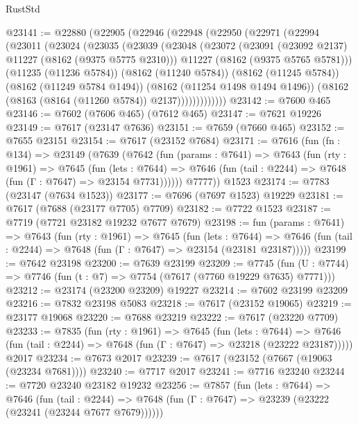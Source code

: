 \begin{lexlean}{RustStd}
\begin{coremodule}
@23141 := @22880
    (@22905
      (@22946
        (@22948
          (@22950
            (@22971
              (@22994
                (@23011
                  (@23024
                    (@23035
                      (@23039
                        (@23048
                          (@23072
                            (@23091 (@23092 @2137) @11227 (@8162 (@9375 @5775 @2310)))
                            @11227
                            (@8162 (@9375 @5765 @5781)))
                          (@11235 (@11236 @5784))
                          (@8162 (@11240 @5784))
                          (@8162 (@11245 @5784))
                          (@8162 (@11249 @5784 @1494))
                          (@8162 (@11254 @1498 @1494 @1496))
                          (@8162 (@8163 (@8164 (@11260 @5784)) @2137)))))))))))))
@23142 := @7600 @465
@23146 := @7602 (@7606 @465) (@7612 @465)
@23147 := @7621 @19226
@23149 := @7617 (@23147 @7636)
@23151 := @7659 (@7660 @465)
@23152 := @7655 @23151
@23154 := @7617 (@23152 @7684)
@23171 := @7616
    (fun (fn : @134) =>
    @23149
      (@7639
        (@7642
          (fun (params : @7641) =>
          @7643
            (fun (rty : @1961) =>
            @7645
              (fun (lets : @7644) =>
              @7646 (fun (tail : @2244) => @7648 (fun (Γ : @7647) => @23154 @7731))))))
        @7777))
    @1523
@23174 := @7783 (@23147 (@7634 @1523))
@23177 := @7696 (@7697 @1523) @19229
@23181 := @7617 (@7688 (@23177 @7705) @7709)
@23182 := @7722 @1523
@23187 := @7719 (@7721 @23182 @19232 @7677 @7679)
@23198 := fun (params : @7641) =>
  @7643
    (fun (rty : @1961) =>
    @7645
      (fun (lets : @7644) =>
      @7646 (fun (tail : @2244) => @7648 (fun (Γ : @7647) => @23154 (@23181 @23187)))))
@23199 := @7642 @23198
@23200 := @7639 @23199
@23209 := @7745
    (fun (U : @7744) => @7746 (fun (t : @7) => @7754 (@7617 (@7760 @19229 @7635) @7771)))
@23212 := @23174 (@23200 @23209) @19227
@23214 := @7602 @23199 @23209
@23216 := @7832 @23198 @5083
@23218 := @7617 (@23152 @19065)
@23219 := @23177 @19068
@23220 := @7688 @23219
@23222 := @7617 (@23220 @7709)
@23233 := @7835
    (fun (rty : @1961) =>
    @7645
      (fun (lets : @7644) =>
      @7646 (fun (tail : @2244) => @7648 (fun (Γ : @7647) => @23218 (@23222 @23187)))))
    @2017
@23234 := @7673 @2017
@23239 := @7617 (@23152 (@7667 (@19063 (@23234 @7681))))
@23240 := @7717 @2017
@23241 := @7716 @23240
@23244 := @7720 @23240 @23182 @19232
@23256 := @7857
    (fun (lets : @7644) =>
    @7646
      (fun (tail : @2244) =>
      @7648 (fun (Γ : @7647) => @23239 (@23222 (@23241 (@23244 @7677 @7679))))))

\end{coremodule}
\end{lexlean}
